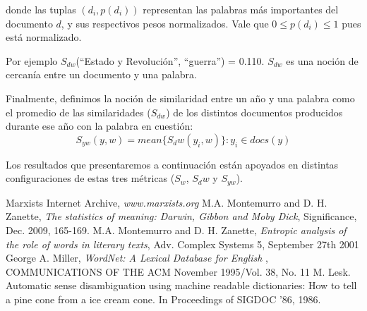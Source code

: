 \documentclass{pnastwo}
\begin{document}
\begin{article}
donde las tuplas $(d_i , p(d_i))$ representan las palabras más importantes del documento $d$, y sus respectivos pesos normalizados. Vale que $0 \leq p(d_i) \leq 1$ pues está normalizado.

Por ejemplo $S_{dw}$(“Estado y Revolución”, “guerra”) = 0.110. $S_{dw}$ es una noción de cercanía entre un documento y una palabra.

Finalmente, definimos la noción de similaridad entre un año y una palabra como el promedio de las similaridades ($S_{dw}$) 
de los distintos documentos producidos durante ese año con la palabra en cuestión:
\begin{equation}
  S_{yw}(y, w) = mean \{ S_dw(y_i, w) \} : y_i \in docs(y) 
\end{equation}

Los resultados que presentaremos a continuaci\'on est\'an apoyados en distintas configuraciones de estas tres m\'etricas ($S_w$, $S_dw$ y $S_{yw}$).

% 




\begin{thebibliography}{10}
Marxists Internet Archive, {\em www.marxists.org} %
M.A. Montemurro and D. H. Zanette, {\em The statistics of meaning: Darwin, Gibbon and Moby Dick}, Significance, Dec. 2009, 165-169.
M.A. Montemurro and D. H. Zanette, {\em Entropic analysis of the role of words in literary texts}, Adv. Complex Systems 5, September 27th 2001
George A. Miller, {\em WordNet: A Lexical Database for English }, COMMUNICATIONS OF THE ACM November 1995/Vol. 38, No. 11
M. Lesk. Automatic sense disambiguation using machine readable dictionaries: How to tell a pine cone from a ice cream cone. In Proceedings of SIGDOC ’86, 1986.
\end{thebibliography}
\end{article}
\end{document}
